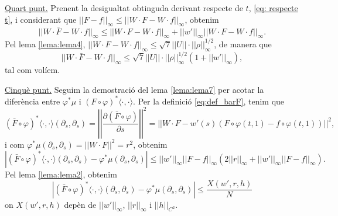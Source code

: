 {\underline{Quart punt.}
Prenent la desigualtat obtinguda derivant respecte de $t$, \ref{eq: respecte t}, i considerant que $||F-f||_\infty\le||W\cdot F - W\cdot f||_\infty$, obtenim
\begin{equation*}
    ||W\cdot\bar F - W\cdot f||_\infty\le ||W\cdot F - W\cdot f||_\infty + ||w'||_\infty||W\cdot F - W\cdot f||_\infty.
\end{equation*}
Pel lema \ref{lema:lema4}, $||W\cdot F - W\cdot f||_\infty\le\sqrt7||U||\cdot||\rho||^{1/2}_\infty$, de manera que
\begin{equation*}
    ||W\cdot\bar F - W\cdot f||_\infty\le\sqrt7||U||\cdot||\rho||^{1/2}_\infty(1+||w'||_\infty),
\end{equation*}
tal com volíem.

\underline{Cinquè punt.} 
Seguim la demostració del lema \ref{lema:lema7} per acotar la diferència entre $\varphi^*\mu$ i $(F\circ\varphi)^*\langle\cdot,\cdot\rangle$. Per la definició \ref{eq:def_barF}, tenim que
\begin{equation*}
    (\bar F\circ\varphi)^*\langle\cdot,\cdot\rangle (\partial_s, \partial_s) = \left|\left|\frac{\partial(\bar F\circ\varphi)}{\partial s}\right|\right|^2 = \left|\left| W\cdot F - w'(s)(F\circ\varphi(t,1)-f\circ\varphi(t,1)) \right|\right|^2,
\end{equation*}
i com $\varphi^*\mu(\partial_s,\partial_s) = ||W\cdot F||^2 = r^2$, obtenim
\begin{equation*}
    |(\bar F\circ\varphi)^*\langle\cdot,\cdot\rangle(\partial_s, \partial_s) - \varphi^*\mu(\partial_s, \partial_s)| \le ||w'||_\infty||F-f||_\infty(2||r||_\infty + ||w'||_\infty||F-f||_\infty).
\end{equation*}
Pel lema \ref{lema:lema2}, obtenim
\begin{equation}
    |(\bar F\circ\varphi)^*\langle\cdot,\cdot\rangle(\partial_s, \partial_s) - \varphi^*\mu(\partial_s, \partial_s)| \le \frac{X(w',r,h)}{N}
\end{equation}
on $X(w',r,h)$ depèn de $||w'||_\infty$, $||r||_\infty$ i $||h||_{C^2}$.

}

